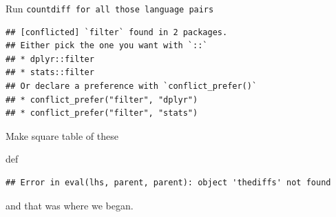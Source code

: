 \documentclass[ignorenonframetext,]{beamer}
\newenvironment{Shaded}{\begin{snugshade}}{\end{snugshade}}
\newcommand{\DataTypeTok}[1]{\textcolor[rgb]{0.13,0.29,0.53}{#1}}
\newcommand{\DecValTok}[1]{\textcolor[rgb]{0.00,0.00,0.81}{#1}}
\newcommand{\KeywordTok}[1]{\textcolor[rgb]{0.13,0.29,0.53}{\textbf{#1}}}
\newcommand{\NormalTok}[1]{#1}
\newcommand{\OperatorTok}[1]{\textcolor[rgb]{0.81,0.36,0.00}{\textbf{#1}}}
\newcommand{\StringTok}[1]{\textcolor[rgb]{0.31,0.60,0.02}{#1}}
\begin{document}
\begin{frame}[fragile]{Run
\texttt{countdiff\ for\ all\ those\ language\ pairs}}
\protect\hypertarget{run-countdiff-for-all-those-language-pairs}{}

\begin{Shaded}
\end{Shaded}

\begin{verbatim}
## [conflicted] `filter` found in 2 packages.
## Either pick the one you want with `::` 
## * dplyr::filter
## * stats::filter
## Or declare a preference with `conflict_prefer()`
## * conflict_prefer("filter", "dplyr")
## * conflict_prefer("filter", "stats")
\end{verbatim}

\end{frame}

\begin{frame}[fragile]{Make square table of these}
\protect\hypertarget{make-square-table-of-these}{}

def

\begin{Shaded}
\end{Shaded}

\begin{verbatim}
## Error in eval(lhs, parent, parent): object 'thediffs' not found
\end{verbatim}

and that was where we began.

\end{frame}
\end{document}
